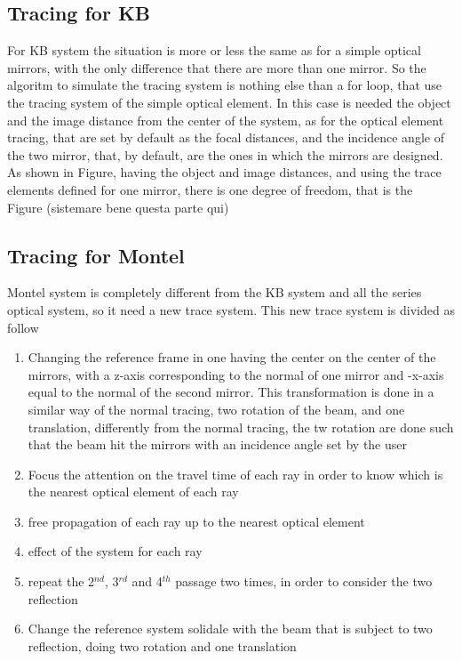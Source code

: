 \subsection{Tracing for KB}
For KB system the situation is more or less the same as for a simple optical mirrors, with the only difference that there are more than one mirror. So the algoritm to simulate the tracing system is nothing else than a for loop, that use the tracing system of the simple optical element. In this case is needed the object and the image distance from the center of the system, as for the optical element tracing, that are set by default as the focal distances, and the incidence angle of the two mirror, that, by default, are the ones in which the mirrors are designed. As shown in Figure, having the object and image distances, and using the trace elements defined for one mirror, there is one degree of freedom, that is the 
\\
Figure (sistemare bene questa parte qui)
\subsection{Tracing for Montel}
Montel system is completely different from the KB system and all the series optical system, so it need a new trace system. This new trace system is divided as follow
\begin{enumerate}
	\item Changing the reference frame in one having the center on the center of the mirrors, with a z-axis corresponding to the normal of one mirror and -x-axis equal to the normal of the second mirror. This transformation is done in a similar way of the normal tracing, two rotation of the beam, and one translation, differently from the normal tracing, the tw rotation are done such that the beam hit the mirrors with an incidence angle set by the user
	\item Focus the attention on the travel time of each ray in order to know which is the nearest optical element of each ray
	\item free propagation of each ray up to the nearest optical element
	\item effect of the system for each ray
	\item repeat the 2$^{nd} $, 3$^{rd} $ and 4$^{th} $ passage two times, in order to consider the two reflection
	\item Change the reference system solidale with the beam that is subject to two reflection, doing two rotation and one translation
\end{enumerate}  

